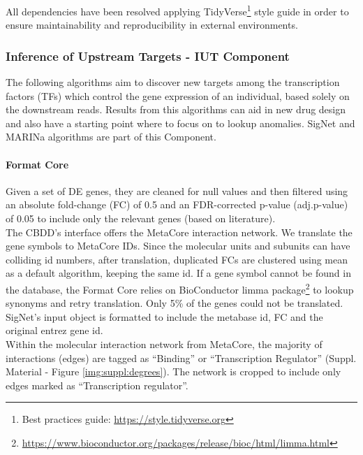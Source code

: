 All dependencies have been resolved applying TidyVerse\footnote{Best practices guide: \url{https://style.tidyverse.org}} style guide in order to ensure maintainability and reproducibility in external environments.

\subsubsection{Inference of Upstream Targets - IUT Component}
The following algorithms aim to discover new targets among the transcription factors (TFs) which control the gene expression of an individual, based solely on the downstream reads. Results from this algorithms can aid in new drug design and also have a starting point where to focus on to lookup anomalies. SigNet and MARINa algorithms are part of this Component.

\paragraph{Format Core}
\label{section:iut-f}
Given a set of DE genes, they are cleaned for null values and then filtered using an absolute fold-change (FC) of 0.5 and an FDR-corrected p-value (adj.p-value) of 0.05 to include only the relevant genes (based on literature).
\\

The CBDD's interface offers the MetaCore interaction network. We translate the gene symbols to MetaCore IDs. Since the molecular units and subunits can have colliding id numbers, after translation, duplicated FCs are clustered using mean as a default algorithm, keeping the same id.
If a gene symbol cannot be found in the database, the Format Core relies on BioConductor limma package\footnote{\url{https://www.bioconductor.org/packages/release/bioc/html/limma.html}} to lookup synonyms and retry translation. Only 5\% of the genes could not be translated.
\\

SigNet’s input object is formatted to include the metabase id, FC and the original entrez gene id.
\\

Within the molecular interaction network from MetaCore, the majority of interactions (edges) are tagged as “Binding” or “Transcription Regulator” (Suppl. Material - Figure \ref{img:suppl:degrees}). The network is cropped to include only edges marked as “Transcription regulator”.

